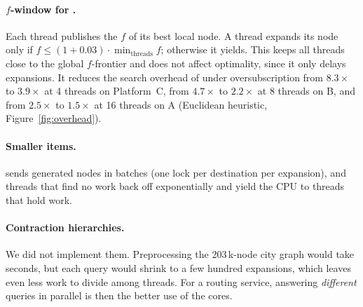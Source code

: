 \paragraph{$f$-window for \HDA.} Each \HDA{} thread publishes the $f$ of its best
local node. A thread expands its node only if
$f \le (1 + 0.03)\cdot \min_{\text{threads}} f$; otherwise it yields. This
keeps all threads close to the global $f$-frontier and does not affect
optimality, since it only delays expansions. It reduces the search overhead of
\HDA{} under oversubscription from $8.3\times$ to $3.9\times$ at 4 threads on
Platform~C, from $4.7\times$ to $2.2\times$ at 8 threads on B, and from
$2.5\times$ to $1.5\times$ at 16 threads on A (Euclidean heuristic,
Figure~\ref{fig:overhead}).

\paragraph{Smaller items.} \HDA{} sends generated nodes in batches (one lock
per destination per expansion), and threads that find no work back off
exponentially and yield the CPU to threads that hold work.

\paragraph{Contraction hierarchies.} We did not implement them. Preprocessing
the 203\,k-node city graph would take seconds, but each query would shrink to
a few hundred expansions, which leaves even less work to divide among threads. For a routing
service, answering \emph{different} queries in parallel is then the better use
of the cores.
